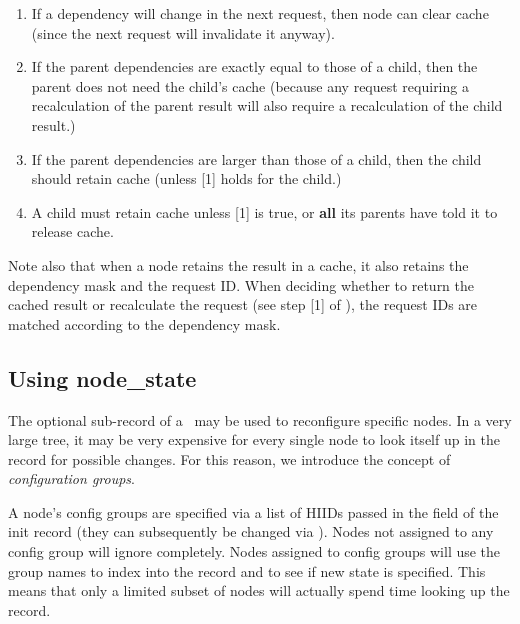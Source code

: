 \documentclass[10pt]{article}
\begin{document}
  \begin{enumerate}
  
  \item If a dependency will change in the next request, then node can clear
    cache (since the next request will invalidate it anyway).

  \item If the parent dependencies are exactly equal to those of a child, then
    the parent does not need the child's cache (because any request requiring a
    recalculation of the parent result will also require a recalculation of the
    child result.)

  \item If the parent dependencies are larger than those of a child, then the 
    child should retain cache (unless [1] holds for the child.) 

  \item A child must retain cache unless [1] is true, or {\bf all} its parents
    have told it to release cache.

  \end{enumerate}
  
  Note also that when a node retains the result in a cache, it also retains the
  dependency mask and the request ID. When deciding whether to return the
  cached result or recalculate the request (see step [1] of ),
  the request IDs are matched according to the dependency mask.
  
\subsection{Using node\_state}

  The optional  sub-record of a \Request\ may be used to
  reconfigure specific nodes. In a very large tree, it may be very expensive
  for every single node to look itself up in the record for possible changes.
  For this reason, we introduce the concept of {\em configuration groups}. 
  
  A node's config groups are specified via a list of HIIDs passed in the
   field of the init record (they can subsequently be
  changed via ). Nodes not assigned to any config group will
  ignore  completely. Nodes assigned to config groups
  will use the group names to index into the  record and to see
  if new state is specified. This means that only a limited subset of nodes
  will actually spend time looking up the  record.
\end{document}
